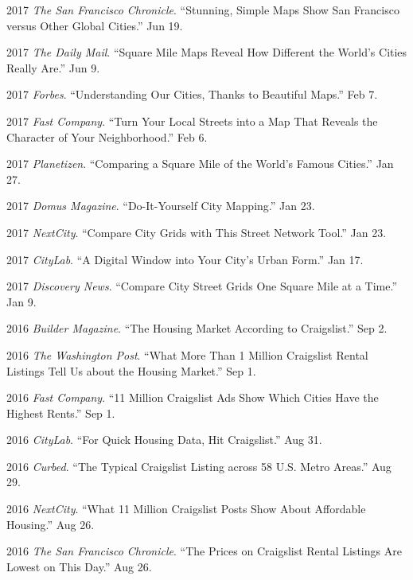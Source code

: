 \documentclass{academiccv}
\begin{document}
\begin{tablist}
	\item 2017 \tab \emph{The San Francisco Chronicle}. \enquote{Stunning, Simple Maps Show San Francisco versus Other Global Cities.} Jun 19.
	
	\item 2017 \tab \emph{The Daily Mail}. \enquote{Square Mile Maps Reveal How Different the World's Cities Really Are.} Jun 9.
	
	\item 2017 \tab \emph{Forbes}. \enquote{Understanding Our Cities, Thanks to Beautiful Maps.} Feb 7.
	
	\item 2017 \tab \emph{Fast Company}. \enquote{Turn Your Local Streets into a Map That Reveals the Character of Your Neighborhood.} Feb 6.
	
	\item 2017 \tab \emph{Planetizen}. \enquote{Comparing a Square Mile of the World's Famous Cities.} Jan 27.
	
	\item 2017 \tab \emph{Domus Magazine}. \enquote{Do-It-Yourself City Mapping.} Jan 23.
	
	\item 2017 \tab \emph{NextCity}. \enquote{Compare City Grids with This Street Network Tool.} Jan 23.
	
	\item 2017 \tab \emph{CityLab}. \enquote{A Digital Window into Your City's Urban Form.} Jan 17.
	
	\item 2017 \tab \emph{Discovery News}. \enquote{Compare City Street Grids One Square Mile at a Time.} Jan 9.
	
	\item 2016 \tab \emph{Builder Magazine}. \enquote{The Housing Market According to Craigslist.} Sep 2.
	
	\item 2016 \tab \emph{The Washington Post}. \enquote{What More Than 1 Million Craigslist Rental Listings Tell Us about the Housing Market.} Sep 1.
	
	\item 2016 \tab \emph{Fast Company}. \enquote{11 Million Craigslist Ads Show Which Cities Have the Highest Rents.} Sep 1.
	
	\item 2016 \tab \emph{CityLab}. \enquote{For Quick Housing Data, Hit Craigslist.} Aug 31.
	
	\item 2016 \tab \emph{Curbed}. \enquote{The Typical Craigslist Listing across 58 U.S. Metro Areas.} Aug 29.
	
	\item 2016 \tab \emph{NextCity}. \enquote{What 11 Million Craigslist Posts Show About Affordable Housing.} Aug 26.
	
	\item 2016 \tab \emph{The San Francisco Chronicle}. \enquote{The Prices on Craigslist Rental Listings Are Lowest on This Day.} Aug 26.
\end{tablist}
\end{document}
